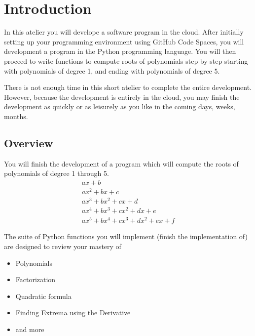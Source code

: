 \section{Introduction}
\label{sec.intro}

In this atelier you will develope a software program in the cloud.  After
initially setting up your programming environment using GitHub Code Spaces, you
will development a  program in the
Python programming language.  You will then proceed to write functions
to compute roots of polynomials step by step starting with polynomials
of degree 1, and ending with polynomials of degree 5.

There is not enough time in this short atelier to complete the entire
development.  However, because the development is entirely in the
cloud, you may finish the development as quickly or as leisurely as
you like in the coming days, weeks, months.

\subsection{Overview}

You will finish the development of a program which will compute the
roots of polynomials of degree 1 through 5.
\begin{align*}
  a x + b\\
  a x^2 + b x + c\\
  a x^3 + b x^2 + c x + d\\
  a x^4 + b x^3 + c x^2 + d x + e\\
  a x^5 + b x^4 + c x^3 + d x^2 + e x + f
\end{align*}

The suite of Python functions you will implement (finish the
implementation of) are designed to review your mastery of
\begin{itemize}
\item Polynomials
\item Factorization
\item Quadratic formula
\item Finding Extrema using the Derivative
\item and more
\end{itemize}

